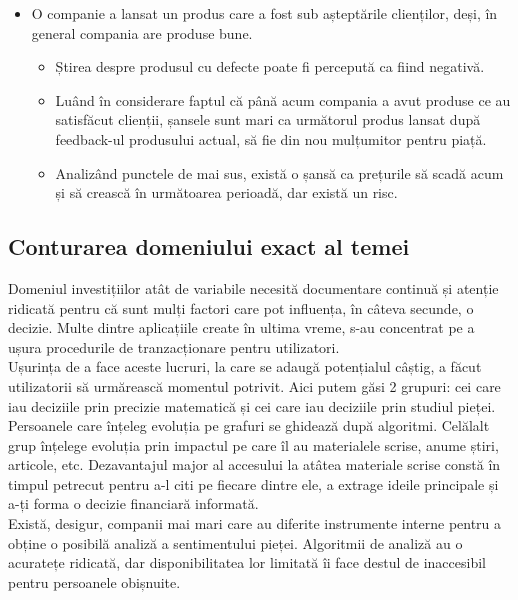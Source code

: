 \begin{itemize}
	\item O companie a lansat un produs care a fost sub așteptările clienților, deși, în general compania are produse bune.
	\begin{itemize}
		\item Știrea despre produsul cu defecte poate fi percepută ca fiind negativă.
	\end{itemize}
	\begin{itemize}
		\item Luând în considerare faptul că până acum compania a avut produse ce au satisfăcut clienții, șansele sunt mari ca următorul produs lansat după feedback-ul produsului actual, să fie din nou mulțumitor pentru piață. 
	\end{itemize}
	\begin{itemize}
		\item Analizând punctele de mai sus, există o șansă ca prețurile să scadă acum și să crească în următoarea perioadă, dar există un risc.
	\end{itemize}
\end{itemize}

\subsection{Conturarea domeniului exact al temei}\label{subsec:numesub}
Domeniul investițiilor atât de variabile necesită documentare continuă și atenție ridicată pentru că sunt mulți factori care pot influența, în câteva secunde, o decizie.
Multe dintre aplicațiile create în ultima vreme, s-au concentrat pe a ușura procedurile de tranzacționare pentru utilizatori.\\ 

Ușurința de a face aceste lucruri, la care se adaugă
potențialul câștig, a făcut utilizatorii să urmărească momentul potrivit. Aici putem găsi 2 grupuri: cei care iau deciziile prin precizie matematică și cei care iau deciziile prin studiul pieței.
Persoanele care înțeleg evoluția pe grafuri se ghidează după algoritmi. Celălalt grup înțelege evoluția prin impactul pe care îl au materialele scrise, anume știri, articole, etc.
Dezavantajul major al accesului la atâtea materiale scrise constă în timpul petrecut pentru a-l citi pe fiecare dintre ele, a extrage ideile principale și a-ți forma o decizie financiară informată.\\

Există, desigur, companii mai mari care au diferite instrumente interne pentru a obține o posibilă analiză a sentimentului pieței.
Algoritmii de analiză au o acuratețe ridicată, dar disponibilitatea lor limitată îi face destul de inaccesibil pentru persoanele obișnuite.\\

